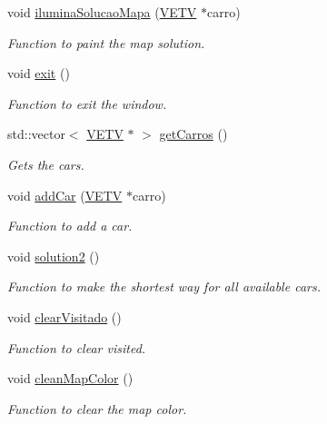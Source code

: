 \begin{DoxyCompactItemize}
\mbox{\label{class_map_a563e49ca8aa23d5681e1f5138582bc48}} 
void \mbox{\hyperlink{class_map_a563e49ca8aa23d5681e1f5138582bc48}{ilumina\+Solucao\+Mapa}} (\mbox{\hyperlink{class_v_e_t_v}{V\+E\+TV}} $\ast$carro)
\begin{DoxyCompactList}\small\item\em Function to paint the map solution. \end{DoxyCompactList}\item 
\mbox{\label{class_map_afc52747affd69dcd9f07344cb427b7b4}} 
void \mbox{\hyperlink{class_map_afc52747affd69dcd9f07344cb427b7b4}{exit}} ()
\begin{DoxyCompactList}\small\item\em Function to exit the window. \end{DoxyCompactList}\item 
std\+::vector$<$ \mbox{\hyperlink{class_v_e_t_v}{V\+E\+TV}} $\ast$ $>$ \mbox{\hyperlink{class_map_a218f885f5ceecd3ac40b91cd4f79c545}{get\+Carros}} ()
\begin{DoxyCompactList}\small\item\em Gets the cars. \end{DoxyCompactList}\item 
\mbox{\label{class_map_ad7539e02bfe15329f9da6b4322a1b076}} 
void \mbox{\hyperlink{class_map_ad7539e02bfe15329f9da6b4322a1b076}{add\+Car}} (\mbox{\hyperlink{class_v_e_t_v}{V\+E\+TV}} $\ast$carro)
\begin{DoxyCompactList}\small\item\em Function to add a car. \end{DoxyCompactList}\item 
\mbox{\label{class_map_a314e6c0a8c984d9bda9ffbb6baa31545}} 
void \mbox{\hyperlink{class_map_a314e6c0a8c984d9bda9ffbb6baa31545}{solution2}} ()
\begin{DoxyCompactList}\small\item\em Function to make the shortest way for all available cars. \end{DoxyCompactList}\item 
\mbox{\label{class_map_a7419b7cf9216949803b3074c6f74b76c}} 
void \mbox{\hyperlink{class_map_a7419b7cf9216949803b3074c6f74b76c}{clear\+Visitado}} ()
\begin{DoxyCompactList}\small\item\em Function to clear visited. \end{DoxyCompactList}\item 
\mbox{\label{class_map_a8f3af5f1841089e8b461f9ab17690d81}} 
void \mbox{\hyperlink{class_map_a8f3af5f1841089e8b461f9ab17690d81}{clean\+Map\+Color}} ()
\begin{DoxyCompactList}\small\item\em Function to clear the map color. \end{DoxyCompactList}\end{DoxyCompactItemize}



